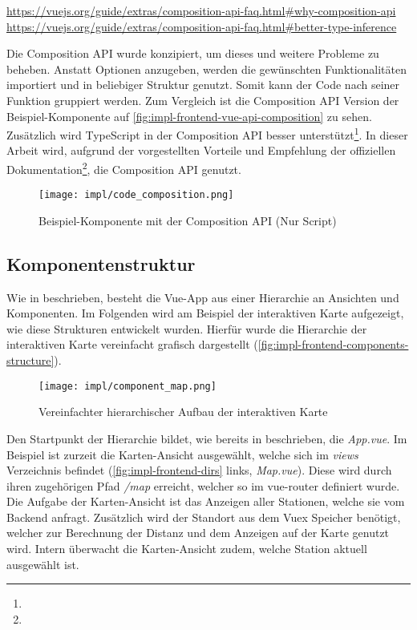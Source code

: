 \urldef\vuecomp\url{https://vuejs.org/guide/extras/composition-api-faq.html#why-composition-api}
\urldef\vuets\url{https://vuejs.org/guide/extras/composition-api-faq.html#better-type-inference}

Die Composition API wurde konzipiert, um dieses und weitere Probleme zu beheben.
Anstatt Optionen anzugeben, werden die gewünschten Funktionalitäten importiert
und in beliebiger Struktur genutzt. Somit kann der Code nach seiner Funktion
gruppiert werden. Zum Vergleich ist die Composition API Version der
Beispiel-Komponente auf \autoref{fig:impl-frontend-vue-api-composition} zu
sehen. Zusätzlich wird TypeScript in der Composition API besser
unterstützt\footnote{\vuets}. In dieser Arbeit wird, aufgrund der vorgestellten
Vorteile und Empfehlung der offiziellen Dokumentation\footnote{\vuecomp}, die
Composition API genutzt.

\begin{figure}[htpb]
    \centering
    \texttt{[image: impl/code\_composition.png]}
    \caption{Beispiel-Komponente mit der Composition API (Nur Script)}
    \label{fig:impl-frontend-vue-api-composition}
\end{figure}


\subsection{Komponentenstruktur}

Wie in  beschrieben, besteht die Vue-App
aus einer Hierarchie an Ansichten und Komponenten. Im Folgenden wird am Beispiel
der interaktiven Karte aufgezeigt, wie diese Strukturen entwickelt wurden.
Hierfür wurde die Hierarchie der interaktiven Karte vereinfacht grafisch
dargestellt (\autoref{fig:impl-frontend-components-structure}).

\begin{figure}[htpb]
    \centering
    \texttt{[image: impl/component\_map.png]}
    \caption{Vereinfachter hierarchischer Aufbau der interaktiven Karte}
    \label{fig:impl-frontend-components-structure}
\end{figure}

Den Startpunkt der Hierarchie bildet, wie bereits in
 beschrieben, die \textit{App.vue}. Im
Beispiel ist zurzeit die Karten-Ansicht ausgewählt, welche sich im
\textit{views} Verzeichnis befindet (\autoref{fig:impl-frontend-dirs} links,
\textit{Map.vue}). Diese wird durch ihren zugehörigen Pfad \textit{/map}
erreicht, welcher so im vue-router definiert wurde. Die Aufgabe der
Karten-Ansicht ist das Anzeigen aller Stationen, welche sie vom Backend anfragt.
Zusätzlich wird der Standort aus dem Vuex Speicher benötigt, welcher zur
Berechnung der Distanz und dem Anzeigen auf der Karte genutzt wird. Intern
überwacht die Karten-Ansicht zudem, welche Station aktuell ausgewählt ist.

